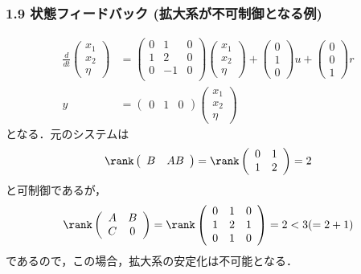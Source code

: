 \begin{frame}[t]
\frametitle{1.9 状態フィードバック (拡大系が不可制御となる例)}
\vspace*{-5mm}

\begin{align}
 \frac{d}{dt}
 \left(
 \begin{array}{c}
  x_1 \\
  x_2 \\
  \eta
 \end{array}
 \right) &=
 \left(
 \begin{array}{ccc}
  0 & 1 & 0 \\
  1 & 2 & 0 \\
  0 & -1 & 0 \\
 \end{array}
 \right)
 \left(
 \begin{array}{c}
  x_1 \\
  x_2 \\
  \eta
 \end{array}
 \right) +
 \left(
 \begin{array}{c}
  0 \\
  1 \\
  0
 \end{array}
 \right) u +
 \left(
 \begin{array}{c}
  0 \\
  0 \\
  1
 \end{array}
 \right) r \\
 y &=
 \left(
 \begin{array}{ccc}
  0 & 1 & 0
 \end{array}
 \right)
 \left(
 \begin{array}{c}
  x_1 \\
  x_2 \\
  \eta
 \end{array}
 \right)
\end{align}
となる．元のシステムは
\begin{gather}
 \rank
 \left(
 \begin{array}{cc}
  B & AB
 \end{array}
 \right) =
 \rank
 \left(
 \begin{array}{cc}
  0 & 1 \\
  1 & 2
 \end{array}
 \right) = 2 \\
\end{gather}
と可制御であるが，
\begin{gather}
 \rank
 \left(
 \begin{array}{cc}
  A & B \\
  C & 0
 \end{array}
 \right) =
 \rank
 \left(
 \begin{array}{ccc}
  0 & 1 & 0 \\
  1 & 2 & 1 \\
  0 & 1 & 0
 \end{array}
 \right) =
 2 < 3(= 2 + 1)
\end{gather}
であるので，この場合，拡大系の安定化は不可能となる．
\end{frame}


